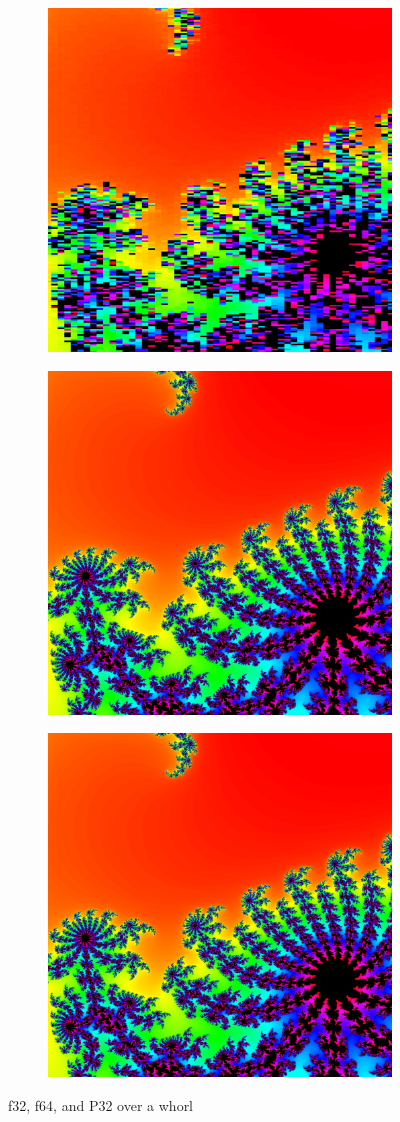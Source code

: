 \documentclass[sigconf,authorversion,nonacm]{acmart}
\begin{document}
\begin{figure}
    \begin{subfigure}[f32]
        \centering
        \includegraphics[width=0.31\linewidth]{images/2-posit-pixels/f32.png}
    \end{subfigure}
    \quad
    \begin{subfigure}[f64]
        \centering
        \includegraphics[width=0.31\linewidth]{images/2-posit-pixels/f64.png}
    \end{subfigure}
    \quad
    \begin{subfigure}[P32]
        \centering
        \includegraphics[width=0.31\linewidth]{images/2-posit-pixels/P32.png}
    \end{subfigure}
    \caption{f32, f64, and P32 over a whorl}
    \label{fig:2-posit-pixels}
\end{figure}
\end{document}
